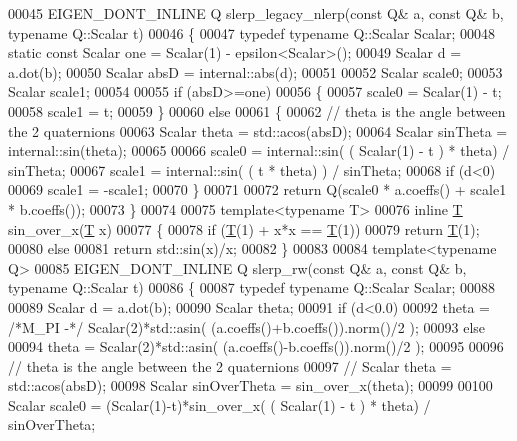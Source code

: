 \begin{DoxyCode}
00045 EIGEN\_DONT\_INLINE Q slerp\_legacy\_nlerp(\textcolor{keyword}{const} Q& a, \textcolor{keyword}{const} Q& b, \textcolor{keyword}{typename} Q::Scalar t)
00046 \{
00047   \textcolor{keyword}{typedef} \textcolor{keyword}{typename} Q::Scalar Scalar;
00048   \textcolor{keyword}{static} \textcolor{keyword}{const} Scalar one = Scalar(1) - epsilon<Scalar>();
00049   Scalar d = a.dot(b);
00050   Scalar absD = internal::abs(d);
00051   
00052   Scalar scale0;
00053   Scalar scale1;
00054   
00055   \textcolor{keywordflow}{if} (absD>=one)
00056   \{
00057     scale0 = Scalar(1) - t;
00058     scale1 = t;
00059   \}
00060   \textcolor{keywordflow}{else}
00061   \{
00062     \textcolor{comment}{// theta is the angle between the 2 quaternions}
00063     Scalar theta = std::acos(absD);
00064     Scalar sinTheta = internal::sin(theta);
00065 
00066     scale0 = internal::sin( ( Scalar(1) - t ) * theta) / sinTheta;
00067     scale1 = internal::sin( ( t * theta) ) / sinTheta;
00068     \textcolor{keywordflow}{if} (d<0)
00069       scale1 = -scale1;
00070   \}
00071 
00072   \textcolor{keywordflow}{return} Q(scale0 * a.coeffs() + scale1 * b.coeffs());
00073 \}
00074 
00075 \textcolor{keyword}{template}<\textcolor{keyword}{typename} T>
00076 \textcolor{keyword}{inline} \hyperlink{group___sparse_core___module}{T} sin\_over\_x(\hyperlink{group___sparse_core___module}{T} x)
00077 \{
00078   \textcolor{keywordflow}{if} (\hyperlink{group___sparse_core___module}{T}(1) + x*x == \hyperlink{group___sparse_core___module}{T}(1))
00079     \textcolor{keywordflow}{return} \hyperlink{group___sparse_core___module}{T}(1);
00080   \textcolor{keywordflow}{else}
00081     \textcolor{keywordflow}{return} std::sin(x)/x;
00082 \}
00083 
00084 \textcolor{keyword}{template}<\textcolor{keyword}{typename} Q>
00085 EIGEN\_DONT\_INLINE Q slerp\_rw(\textcolor{keyword}{const} Q& a, \textcolor{keyword}{const} Q& b, \textcolor{keyword}{typename} Q::Scalar t)
00086 \{
00087   \textcolor{keyword}{typedef} \textcolor{keyword}{typename} Q::Scalar Scalar;
00088   
00089   Scalar d = a.dot(b);
00090   Scalar theta;
00091   \textcolor{keywordflow}{if} (d<0.0)
00092     theta = \textcolor{comment}{/*M\_PI -*/} Scalar(2)*std::asin( (a.coeffs()+b.coeffs()).norm()/2 );
00093   \textcolor{keywordflow}{else}
00094     theta = Scalar(2)*std::asin( (a.coeffs()-b.coeffs()).norm()/2 );
00095   
00096   \textcolor{comment}{// theta is the angle between the 2 quaternions}
00097 \textcolor{comment}{//   Scalar theta = std::acos(absD);}
00098   Scalar sinOverTheta = sin\_over\_x(theta);
00099 
00100   Scalar scale0 = (Scalar(1)-t)*sin\_over\_x( ( Scalar(1) - t ) * theta) / sinOverTheta;

\end{DoxyCode}

